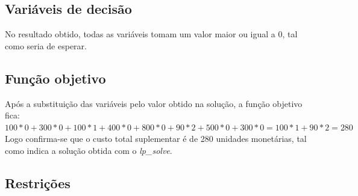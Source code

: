 \subsection{Variáveis de decisão}

No resultado obtido, todas as variáveis tomam um valor maior ou igual a 0, tal
como seria de esperar.

\subsection{Função objetivo}

Após a substituição das variáveis pelo valor obtido na solução, a função
objetivo fica:\\[0.5cm]

$100 * 0 + 300 * 0 + 100 *1 + 400 * 0 + 800 *0 + 90 *2
+ 500 *0 + 300 *0 = 100 * 1 + 90 * 2 = 280$\\[0.2cm]

Logo confirma-se que o custo total suplementar é de 280 unidades monetárias, tal como indica
a solução obtida com o \textit{lp\_solve}.\\[0.5cm]

\subsection{Restrições}

